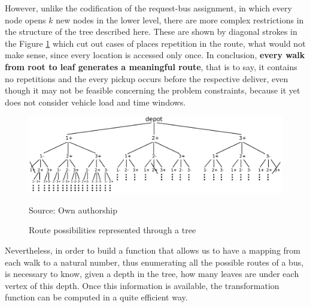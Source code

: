 \documentclass[tuberlin,cic,tc,openright,english,noabntcite,oneside]{iiufrgs}
\begin{document}
However, unlike the codification of the request-bus assignment, in which every node opens $k$ new nodes in the lower level, there are more complex restrictions in the structure of the tree described here. These are shown by diagonal strokes in the Figure \ref{fig:tree_bus_route} which cut out cases of places repetition in the route, what would not make sense, since every location is accessed only once. In conclusion, \textbf{every walk from root to leaf generates a meaningful route}, that is to say, it contains no repetitions and the every pickup occurs before the respective deliver, even though it may not be feasible concerning the problem constraints, because it yet does not consider vehicle load and time windows.
\begin{figure}[H]
	\centering
    \caption{Route possibilities represented through a tree}
    \includegraphics[width=\textwidth]{fig_tree_bus_route}\par
    Source: Own authorship
    \label{fig:tree_bus_route}
\end{figure}

Nevertheless, in order to build a function that allows us to have a mapping from each walk to a natural number, thus enumerating all the possible routes of a bus, is necessary to know, given a depth in the tree, how many leaves are under each vertex of this depth. Once this information is available, the transformation function can be computed in a quite efficient way.
\end{document}
